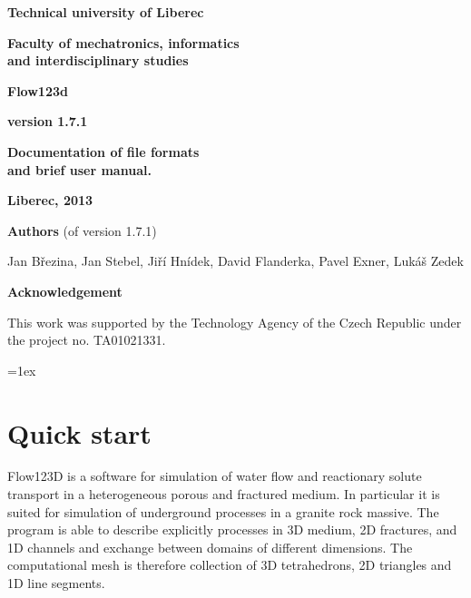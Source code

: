 \documentclass[12pt,a4paper]{report}
\begin{document}
\thispagestyle{empty}
\begin{center}
\noindent 
\textbf{\LARGE{
  Technical university of Liberec
}}

\vspace{2ex}
\textbf{\LARGE{
  Faculty of mechatronics, informatics\\
  and interdisciplinary studies
}}

\vspace{160pt}

\textbf{\Huge{
Flow123d
}}

\vspace{1cm}
\textbf{\Large{
version 1.7.1
}}

\vspace{1cm}

\textbf{\Large{
Documentation of file formats \\
and brief user manual.
}}

\vspace{9cm}




\noindent \textbf{\Large{Liberec, 2013}}

\vspace{1cm}
\pagebreak
\end{center}

\noindent
{\bf Authors} (of version 1.7.1)

\vspace{3ex}    
\noindent
Jan B\v rezina, Jan Stebel, Ji\v r\' i Hn\' idek, David Flanderka, Pavel Exner, Luk\' a\v s Zedek

\vspace{3cm}
\noindent
{\bf Acknowledgement}

\vspace{3ex}
\noindent This work was supported by the Technology Agency of the Czech Republic under
the project no. TA01021331.

\pagebreak
\noindent

\tableofcontents
\pagebreak

\parindent=0pt
\parskip=1ex

\chapter{Quick start}

Flow123D is a software for simulation of water flow and reactionary solute transport in a heterogeneous 
porous and fractured medium. In particular it is suited for simulation of underground processes in a granite rock massive.
The program is able to describe explicitly processes in 3D medium, 2D fractures, and 1D channels and exchange between 
domains of different dimensions. The computational mesh is therefore collection of 3D tetrahedrons, 2D triangles and 1D line segments.
\end{document}
